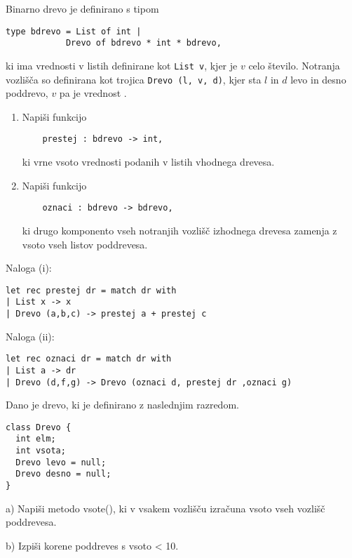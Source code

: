 \begin{ex}
  Binarno drevo je definirano s tipom
\begin{lstlisting}
type bdrevo = List of int |
            Drevo of bdrevo * int * bdrevo,
\end{lstlisting}
  ki ima vrednosti v listih definirane kot \lstinline{List v}, kjer je
  $v$ celo \v stevilo.  Notranja vozli\v s\v ca so definirana kot
  trojica \lstinline{Drevo (l, v, d)}, kjer sta $l$ in $d$ levo in desno
  poddrevo, $v$ pa je vrednost%
.
  \begin{enumerate}[label=(\roman*)]
  \item Napi\v si funkcijo
    \begin{lstlisting}
    prestej : bdrevo -> int, 
\end{lstlisting}
    ki vrne vsoto vrednosti podanih v listih vhodnega drevesa.

  \item Napi\v si funkcijo
    \begin{lstlisting}
    oznaci : bdrevo -> bdrevo,
\end{lstlisting}
    ki drugo komponento vseh notranjih vozli\v s\v c izhodnega drevesa
    zamenja z vsoto vseh listov poddrevesa.
  \end{enumerate}
\begin{sol}
Naloga (i):
\begin{lstlisting}
let rec prestej dr = match dr with
| List x -> x
| Drevo (a,b,c) -> prestej a + prestej c
\end{lstlisting}
Naloga (ii):
\begin{lstlisting}
let rec oznaci dr = match dr with
| List a -> dr 
| Drevo (d,f,g) -> Drevo (oznaci d, prestej dr ,oznaci g)
\end{lstlisting}
\end{sol}

\end{ex} 
\begin{ex}
Dano je drevo, ki je definirano z naslednjim razredom.

\begin{lstlisting}
class Drevo {
  int elm;
  int vsota;
  Drevo levo = null;
  Drevo desno = null;
}
\end{lstlisting}

a) Napi\v si metodo vsote(), ki v vsakem vozli\v s\v cu izra\v cuna vsoto vseh vozli\v s\v c poddrevesa.

b) Izpi\v si korene poddreves s vsoto < 10.



\end{ex}
